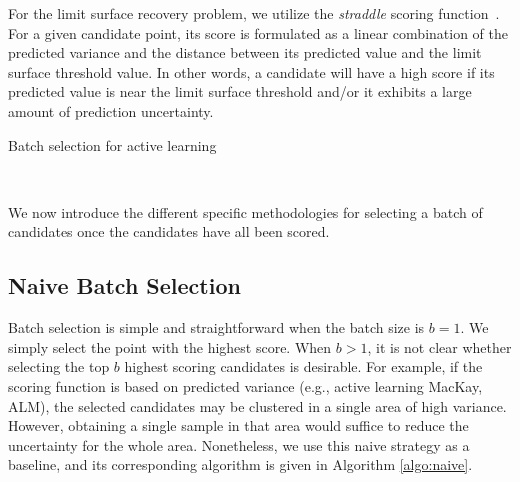 For the limit surface recovery problem, we utilize the \emph{straddle} scoring function~\cite{BryanSchneiderNichol2005}.
%
For a given candidate point, its score is formulated as a linear combination of the predicted variance and the distance between its predicted value and the limit surface threshold value.
%
In other words, a candidate will have a high score if its predicted value is near the limit surface threshold and/or it exhibits a large amount of prediction uncertainty.

{\fontsize{10}{10}\selectfont
\begin{algorithm}
\scriptsize
\caption{Batch selection for active learning}
\label{algo:al}
\begin{algorithmic}
\\
\EndWhile
\end{algorithmic}
\end{algorithm}
}

We now introduce the different specific methodologies for selecting a batch of candidates once the candidates have all been scored.

\subsection{Naive Batch Selection}
Batch selection is simple and straightforward when the batch size is $b = 1$.
%
We simply select the point with the highest score.
%
When $b>1$, it is not clear whether selecting the top $b$ highest scoring candidates is desirable.
%
For example, if the scoring function is based on predicted variance (e.g., active learning MacKay, ALM), the selected candidates may be clustered in a single area of high variance.
%
However, obtaining a single sample in that area would suffice to reduce the uncertainty for the whole area.
%
Nonetheless, we use this naive strategy as a baseline, and its corresponding algorithm is given in Algorithm \ref{algo:naive}.

